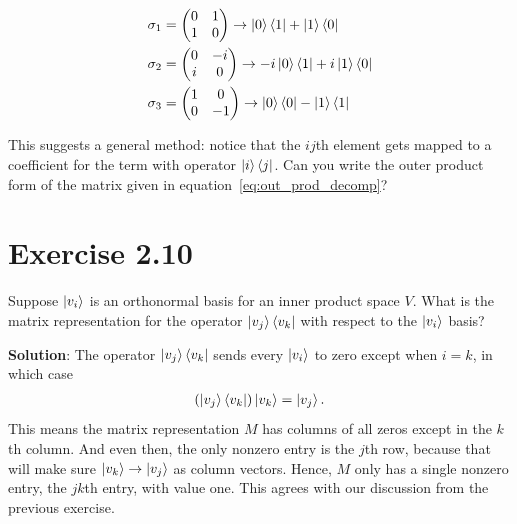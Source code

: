 \documentclass{book}
\begin{document}
    \begin{align}
    \begin{aligned}
        \sigma_1 &=
        \begin{pmatrix}
            0 & 1 \\
            1 & 0
        \end{pmatrix} \rightarrow
        \ket{0}\bra{1} + \ket{1}\bra{0} \\
        \sigma_2 &=
        \begin{pmatrix}
            0 & -i \\
            i & 0
        \end{pmatrix} \rightarrow
        -i \ket{0}\bra{1} + i \ket{1}\bra{0} \\
        \sigma_3 &=
        \begin{pmatrix}
            1 & 0 \\
            0 & -1
        \end{pmatrix} \rightarrow
        \ket{0}\bra{0} - \ket{1}\bra{1}
    \end{aligned}
    \end{align}
    
    This suggests a general method: notice that the $ij$th element gets mapped to a coefficient for the term with operator $\ket{i}\bra{j}$. Can you write the outer product form of the matrix given in equation~\eqref{eq:out_prod_decomp}?
    
\section*{Exercise 2.10}
    Suppose $\ket{v_i}$ is an orthonormal basis for an inner product space $V$. What is the matrix representation for the operator $\ket{v_j}\bra{v_k}$ with respect to the $\ket{v_i}$ basis?
    
    \textbf{Solution}: The operator $\ket{v_j}\bra{v_k}$ sends every $\ket{v_i}$ to zero except when $i = k$, in which case
    \begin{align}
        \left(\ket{v_j}\bra{v_k}\right) \ket{v_k} = \ket{v_j}.
    \end{align}
    This means the matrix representation $M$ has columns of all zeros except in the $k$th column. And even then, the only nonzero entry is the $j$th row, because that will make sure $\ket{v_k} \rightarrow \ket{v_j}$ as column vectors. Hence, $M$ only has a single nonzero entry, the $jk$th entry, with value one. This agrees with our discussion from the previous exercise. 
    
\end{document}
